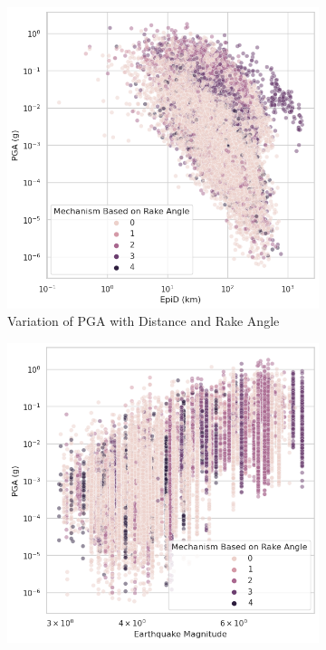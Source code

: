 \documentclass[a4paper,10pt]{article}
\begin{document}
\begin{figure}[h]
     \centering
     \begin{subfigure}[b]{0.45\textwidth}
         \centering
         \includegraphics[width=\textwidth]{PGA_distance_Mechanism}
         \caption{Variation of PGA with Distance and Rake Angle}
     \end{subfigure}
     \hfill
     \begin{subfigure}[b]{0.45\textwidth}
         \centering
         \includegraphics[width=\textwidth]{PGA_Mag_Mechanism}

\end{subfigure}
\end{figure}
\end{document}
